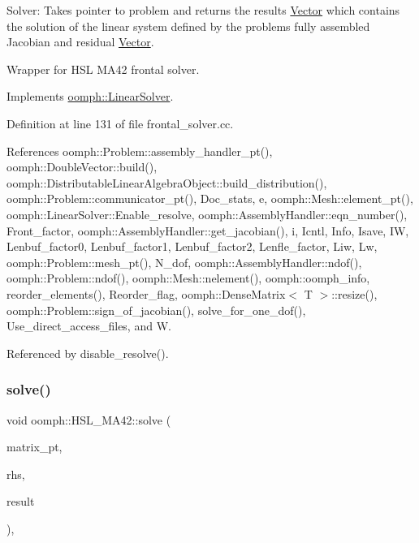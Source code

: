 Solver\+: Takes pointer to problem and returns the results \hyperlink{classoomph_1_1Vector}{Vector} which contains the solution of the linear system defined by the problem\textquotesingle{}s fully assembled Jacobian and residual \hyperlink{classoomph_1_1Vector}{Vector}. 

Wrapper for H\+SL M\+A42 frontal solver. 

Implements \hyperlink{classoomph_1_1LinearSolver_a15ce22542b74ed1826ea485edacbeb6e}{oomph\+::\+Linear\+Solver}.



Definition at line 131 of file frontal\+\_\+solver.\+cc.



References oomph\+::\+Problem\+::assembly\+\_\+handler\+\_\+pt(), oomph\+::\+Double\+Vector\+::build(), oomph\+::\+Distributable\+Linear\+Algebra\+Object\+::build\+\_\+distribution(), oomph\+::\+Problem\+::communicator\+\_\+pt(), Doc\+\_\+stats, e, oomph\+::\+Mesh\+::element\+\_\+pt(), oomph\+::\+Linear\+Solver\+::\+Enable\+\_\+resolve, oomph\+::\+Assembly\+Handler\+::eqn\+\_\+number(), Front\+\_\+factor, oomph\+::\+Assembly\+Handler\+::get\+\_\+jacobian(), i, Icntl, Info, Isave, IW, Lenbuf\+\_\+factor0, Lenbuf\+\_\+factor1, Lenbuf\+\_\+factor2, Lenfle\+\_\+factor, Liw, Lw, oomph\+::\+Problem\+::mesh\+\_\+pt(), N\+\_\+dof, oomph\+::\+Assembly\+Handler\+::ndof(), oomph\+::\+Problem\+::ndof(), oomph\+::\+Mesh\+::nelement(), oomph\+::oomph\+\_\+info, reorder\+\_\+elements(), Reorder\+\_\+flag, oomph\+::\+Dense\+Matrix$<$ T $>$\+::resize(), oomph\+::\+Problem\+::sign\+\_\+of\+\_\+jacobian(), solve\+\_\+for\+\_\+one\+\_\+dof(), Use\+\_\+direct\+\_\+access\+\_\+files, and W.



Referenced by disable\+\_\+resolve().

\mbox{\label{classoomph_1_1HSL__MA42_a6b070c607e2e5f6af4881428d07a6423}} 
\subsubsection{\texorpdfstring{solve()}{solve()}\hspace{0.1cm}{\footnotesize\ttfamily [2/3]}}
{\footnotesize\ttfamily void oomph\+::\+H\+S\+L\+\_\+\+M\+A42\+::solve (\begin{DoxyParamCaption}\item[{\hyperlink{classoomph_1_1DoubleMatrixBase}{Double\+Matrix\+Base} $\ast$const \&}]{matrix\+\_\+pt,  }\item[{const \hyperlink{classoomph_1_1DoubleVector}{Double\+Vector} \&}]{rhs,  }\item[{\hyperlink{classoomph_1_1DoubleVector}{Double\+Vector} \&}]{result }\end{DoxyParamCaption})\hspace{0.3cm}{\ttfamily [inline]}, {\ttfamily [virtual]}}



